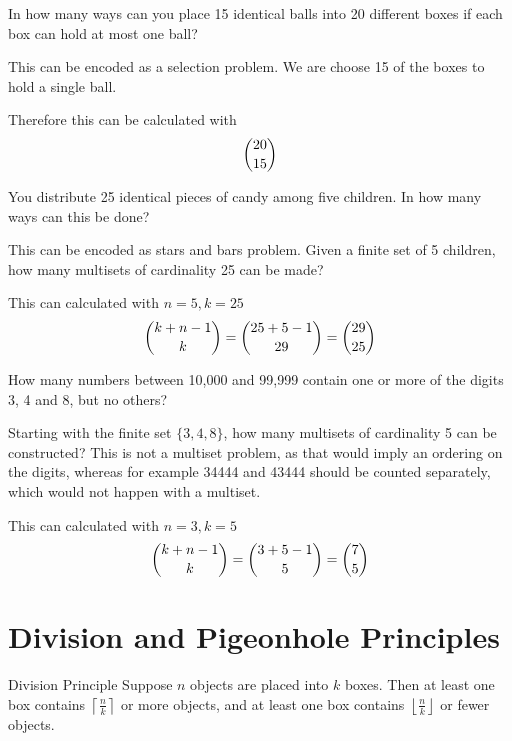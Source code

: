 \documentclass[openany, 12pt]{book}
\begin{document}
\begin{exercise}{}{}
	In how many ways can you place 15 identical balls into 20
	different boxes if each box can hold at most one ball?
	\begin{alist}
		\item This can be encoded as a selection problem. We are choose 15 of the boxes
		to hold a single ball.
		\item Therefore this can be calculated with
		$$ \dbinom{20}{15}$$
	\end{alist}
\end{exercise}

\begin{exercise}{}{}
	You distribute 25 identical pieces of candy among five children. In how many
	ways can this be done?
	\begin{alist}
		\item This can be encoded as stars and bars problem. Given a finite set of 5
		children, how many multisets of cardinality 25 can be made?
		\item This can calculated with $n=5, k=25$
		$$ \dbinom{k+n-1}{k} = \dbinom{25+5-1}{29}=\dbinom{29}{25}$$
	\end{alist}
\end{exercise}

\begin{exercise}{}{}
	How many numbers between 10,000 and 99,999 contain one or more of the digits
	3, 4 and 8, but no others?
	\begin{alist}
		\item Starting with the finite set $\{3, 4, 8\}$, how many multisets of
		cardinality 5 can be constructed? This is not a multiset problem, as that
		would imply an ordering on the digits, whereas for example 34444 and 43444
		should be counted separately, which would not happen with a multiset.
		\item This can calculated with $n=3, k=5$
		$$ \dbinom{k+n-1}{k} = \dbinom{3+5-1}{5}=\dbinom{7}{5}$$
	\end{alist}
\end{exercise}

\section{Division and Pigeonhole Principles}

\begin{definition} {Division Principle}{}
	Suppose $n$ objects are placed into $k$ boxes. Then at least one box
	contains $\left\lceil\frac{n}{k}\right\rceil$ or more objects, and at least
	one box contains $\left\lfloor\frac{n}{k}\right\rfloor$ or fewer objects.
\end{definition}
\end{document}
